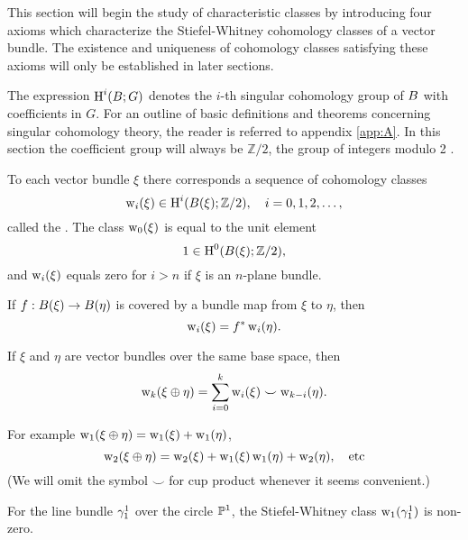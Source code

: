 \documentclass[../main]{subfiles}
\begin{document}
This section will begin the study of characteristic classes by introducing four axioms which characterize the Stiefel-Whitney cohomology classes of a vector bundle. The existence and uniqueness of cohomology classes satisfying these axioms will only be established in later sections.

The expression $\operatorname{H}^i(B;G)$ denotes the $i$-th singular cohomology group of $B$ with coefficients in $G$. For an outline of basic definitions and theorems concerning singular cohomology theory, the reader is referred to appendix \ref{app:A}. In this section the coefficient group will always be $\mathbb{Z} / 2$, the group of integers modulo 2 .

\begin{axiom}
\label{axi:04.01}
To each vector bundle $\xi$ there corresponds a sequence of cohomology classes
\[
\operatorname{w}_i(\xi) \in \operatorname{H}^i(B(\xi); \mathbb{Z} / 2), \quad i=0,1,2, \ldots,
\]
called the . The class $\operatorname{w}_0(\xi)$ is equal to the unit element
\[
1 \in \operatorname{H}^0(B(\xi); \mathbb{Z} / 2),
\]
and $\operatorname{w}_i(\xi)$ equals zero for $i > n$ if $\xi$ is an $n$-plane bundle.
\end{axiom}

\begin{axiom}[Naturality]
\label{axi:04.02}
If $f:B(\xi) \rightarrow B(\eta)$ is covered by a bundle map from $\xi$ to $\eta$, then
\[
\operatorname{w}_i(\xi) = f^*\operatorname{w}_i(\eta).
\]
\end{axiom}

\begin{axiom}
\label{axi:04.03}
If $\xi$ and $\eta$ are vector bundles over the same base space, then
\[
\operatorname{w}_k(\xi \oplus \eta)=\sum_{i=0}^{k} \operatorname{w}_i(\xi) \smile \operatorname{w}_{k-i}(\eta).
\]
\end{axiom}
For example $\operatorname{w}_1(\xi \oplus \eta)=\operatorname{w}_1(\xi)+\operatorname{w}_1(\eta)$, 
\[
\operatorname{w}_2(\xi \oplus \eta)=\operatorname{w}_2(\xi)+\operatorname{w}_1(\xi) \operatorname{w}_1(\eta)+\operatorname{w}_2(\eta), \quad \text{etc}
\]
(We will omit the symbol $\smile$ for cup product whenever it seems convenient.)

\begin{axiom}
\label{axi:04.04}
For the line bundle $\gamma_{1}^{1}$ over the circle $\mathbb{P}^{1}$, the Stiefel-Whitney class $\operatorname{w}_{1}(\gamma_{1}^{1})$ is non-zero.
\end{axiom}
\end{document}
